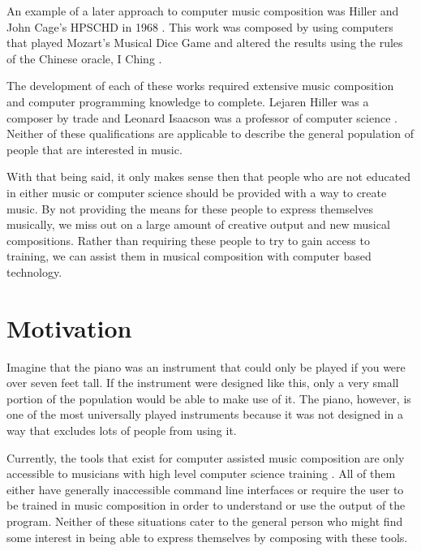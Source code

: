An example of a later approach to computer music composition was Hiller and John Cage's HPSCHD in 1968 \cite{Brit_2018}.  This work was composed by using computers that played Mozart's Musical Dice Game and altered the results using the rules of the Chinese oracle, I Ching \cite{Brit_2018}.

\vspace{\baselineskip}

The development of each of these works required extensive music composition and computer programming knowledge to complete.  Lejaren Hiller was a composer by trade and Leonard Isaacson was a professor of computer science \cite{Brit_2018}.  Neither of these qualifications are applicable to describe the general population of people that are interested in music.

\vspace{\baselineskip}

With that being said, it only makes sense then that people who are not educated in either music or computer science should be provided with a way to create music.  By not providing the means for these people to express themselves musically, we miss out on a large amount of creative output and new musical compositions.  Rather than requiring these people to try to gain access to training, we can assist them in musical composition with computer based technology.

\section{Motivation} 
\label{sec:motivation}

Imagine that the piano was an instrument that could only be played if you were over seven feet tall.  If the instrument were designed like this, only a very small portion of the population would be able to make use of it.  The piano, however, is one of the most universally played instruments because it was not designed in a way that excludes lots of people from using it.

\vspace{\baselineskip}

Currently, the tools that exist for computer assisted music composition are only accessible to musicians with high level computer science training \cite{Teymuri_2019}.  All of them either have generally inaccessible command line interfaces or require the user to be trained in music composition in order to understand or use the output of the program.  Neither of these situations cater to the general person who might find some interest in being able to express themselves by composing with these tools.

